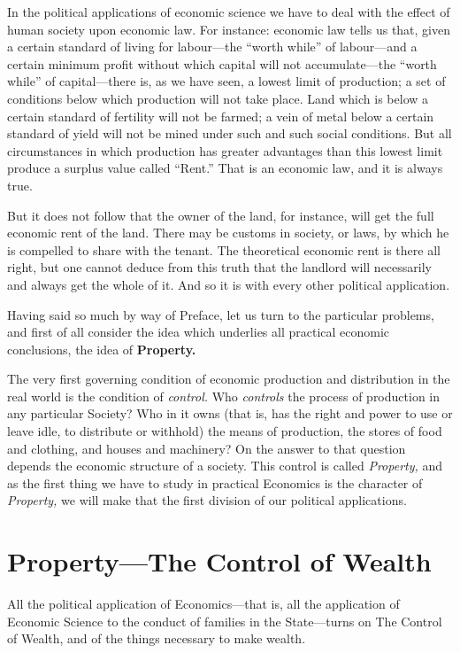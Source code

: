 \documentclass{book}
\begin{document}
In the political applications of economic science we have to deal with the effect of human society upon economic law. For instance: economic law tells us that, given a certain standard of living for labour—the “worth while” of labour—and a certain minimum profit without which capital will not accumulate—the “worth while” of capital—there is, as we have seen, a lowest limit of production; a set of conditions below which production will not take place. Land which is below a certain standard of fertility will not be farmed; a vein of metal below a certain standard of yield will not be mined under such and such social conditions. But all circumstances in which production has greater advantages than this lowest limit produce a surplus value called “Rent.” That is an economic law, and it is always true.

But it does not follow that the owner of the land, for instance, will get the full economic rent of the land. There may be customs in society, or laws, by which he is compelled to share with the tenant. The theoretical economic rent is there all right, but one cannot deduce from this truth that the landlord will necessarily and always get the whole of it. And so it is with every other political application.

Having said so much by way of Preface, let us turn to the particular problems, and first of all consider the idea which underlies all practical economic conclusions, the idea of \textbf{Property.}

The very first governing condition of economic production and distribution in the real world is the condition of \emph{control.} Who \emph{controls} the process of production in any particular Society? Who in it owns (that is, has the right and power to use or leave idle, to distribute or withhold) the means of production, the stores of food and clothing, and houses and machinery? On the answer to that question depends the economic structure of a society. This control is called \emph{Property,} and as the first thing we have to study in practical Economics is the character of \emph{Property,} we will make that the first division of our political applications.

\chapter*{Property—The Control of Wealth}
\label{chapter-10}
All the political application of Economics—that is, all the application of Economic Science to the conduct of families in the State—turns on The Control of Wealth, and of the things necessary to make wealth.
\end{document}
